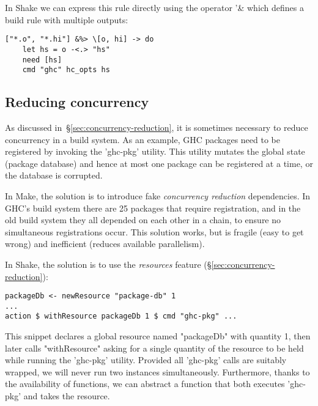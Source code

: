 In Shake we can express this rule directly using the operator \lst'&%
which defines a build rule with multiple outputs:


\begin{lstlisting}
["*.o", "*.hi"] &%> \[o, hi] -> do
    let hs = o -<.> "hs"
    need [hs]
    cmd "ghc" hc_opts hs
\end{lstlisting}

\subsection{Reducing concurrency\label{sec:ghc-pkg-db}}

As discussed in~\S\ref{sec:concurrency-reduction}, it is sometimes necessary to
reduce concurrency in a build system. As an example, GHC packages need to
be registered by invoking the \lst'ghc-pkg' utility. This utility mutates the
global state (package database) and hence at most one package can be registered
at a time, or the database is corrupted.

In Make, the solution is to introduce fake \emph{concurrency
reduction} dependencies. In GHC's build system there are 25
packages that require registration,
and in the old build system they all depended on each other in a chain, to
ensure no simultaneous registrations occur. This solution works, but is
fragile (easy to get wrong) and inefficient (reduces available parallelism).

In Shake, the solution is to use the \emph{resources} feature
(\S\ref{sec:concurrency-reduction}):

\begin{lstlisting}
packageDb <- newResource "package-db" 1
...
action $ withResource packageDb 1 $ cmd "ghc-pkg" ...
\end{lstlisting}

This snippet declares a global resource named \lst"packageDb" with quantity 1,
then later calls \lst"withResource" asking for a single quantity of the resource
to be held while running the
\lst'ghc-pkg' utility. Provided all \lst'ghc-pkg' calls are suitably wrapped,
we will never run two instances simultaneously. Furthermore, thanks to the
availability of functions, we can abstract a function that both executes
\lst'ghc-pkg' and takes the resource.


